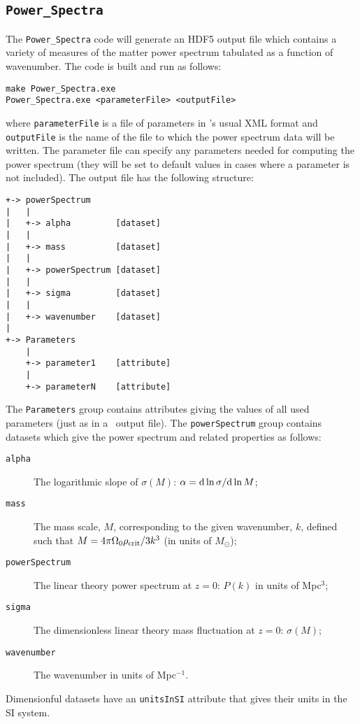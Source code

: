 \subsection{{\tt Power\_Spectra}}

The {\tt Power\_Spectra} code will generate an HDF5 output file which contains a variety of measures of the matter power spectrum tabulated as a function of wavenumber. The code is built and run as follows:
\begin{verbatim}
make Power_Spectra.exe
Power_Spectra.exe <parameterFile> <outputFile>
\end{verbatim}
where {\tt parameterFile} is a file of parameters in \glc's usual XML format and {\tt outputFile} is the name of the file to which the power spectrum data will be written. The parameter file can specify any parameters needed for computing the power spectrum (they will be set to default values in cases where a parameter is not included).
The output file has the following structure:
\begin{verbatim}
+-> powerSpectrum
|   |
|   +-> alpha         [dataset]
|   |
|   +-> mass          [dataset]
|   |
|   +-> powerSpectrum [dataset]
|   |
|   +-> sigma         [dataset]
|   |
|   +-> wavenumber    [dataset]
|    
+-> Parameters
    |
    +-> parameter1    [attribute]
    |
    +-> parameterN    [attribute]
\end{verbatim}
The {\tt Parameters} group contains attributes giving the values of all used parameters (just as in a \glc\ output file). The {\tt powerSpectrum} group contains datasets which give the power spectrum and related properties as follows:
\begin{description}
\item [{\tt alpha}] The logarithmic slope of $\sigma(M)$: $\alpha = {\rm d} \ln \sigma / {\rm d} \ln M$;
\item [{\tt mass}] The mass scale, $M$, corresponding to the given wavenumber, $k$, defined such that $M=4 \pi \Omega_0 \rho_{\rm crit} / 3 k^3$ (in units of $M_\odot$);
\item [{\tt powerSpectrum}] The linear theory power spectrum at $z=0$: $P(k)$ in units of Mpc$^3$;
\item [{\tt sigma}] The dimensionless linear theory mass fluctuation at $z=0$: $\sigma(M)$;
\item [{\tt wavenumber}] The wavenumber in units of Mpc$^{-1}$.
\end{description}
Dimensionful datasets have an {\tt unitsInSI} attribute that gives their units in the SI system.
